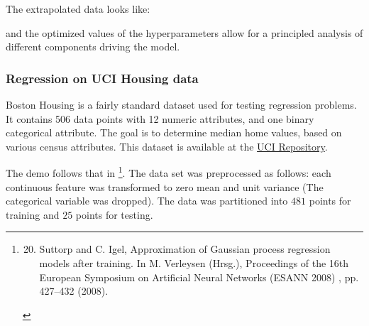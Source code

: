 \documentclass[letterpaper,10pt,english]{sphinxmanual}
\begin{document}
The extrapolated data looks like:
\begin{figure}[htbp]
\centering

\end{figure}

and the optimized values of the hyperparameters allow for a principled analysis of different components driving the model.


\subsubsection{Regression on UCI Housing data}
\label{demoHousing::doc}\label{demoHousing:regression-on-uci-housing-data}\label{demoHousing:gpml}
Boston Housing is a fairly standard dataset used for testing regression problems. It contains 506 data points with 12 numeric attributes, and one binary
categorical attribute.  The goal is to determine median home values, based on various census attributes. This dataset is available at the \href{http://archive.ics.uci.edu/ml/datasets/Housing}{UCI
Repository}.

The demo follows that in \footnote{\begin{enumerate}
\setcounter{enumi}{19}
\item {} 
Suttorp and C. Igel, Approximation of Gaussian process regression models after training. In M. Verleysen (Hrsg.), Proceedings of the 16th European Symposium on Artificial Neural Networks (ESANN 2008) , pp. 427–432 (2008).

\end{enumerate}
}.  The data set was preprocessed as follows: each continuous feature was transformed to zero mean and
unit variance (The categorical variable was dropped).  The data was partitioned into $481$ points for training and $25$ points for testing.
\end{document}
